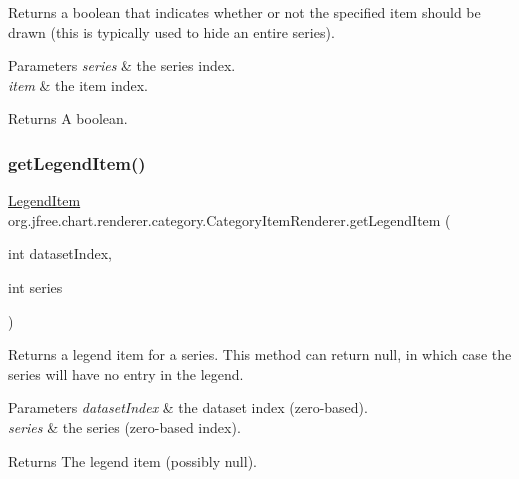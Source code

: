 Returns a boolean that indicates whether or not the specified item should be drawn (this is typically used to hide an entire series).


\begin{DoxyParams}{Parameters}
{\em series} & the series index. \\
\hline
{\em item} & the item index.\\
\hline
\end{DoxyParams}
\begin{DoxyReturn}{Returns}
A boolean. 
\end{DoxyReturn}
\mbox{\label{interfaceorg_1_1jfree_1_1chart_1_1renderer_1_1category_1_1_category_item_renderer_ab9269f34c8b4859211e4f4472636c93c}} 
\subsubsection{\texorpdfstring{get\+Legend\+Item()}{getLegendItem()}}
{\footnotesize\ttfamily \mbox{\hyperlink{classorg_1_1jfree_1_1chart_1_1_legend_item}{Legend\+Item}} org.\+jfree.\+chart.\+renderer.\+category.\+Category\+Item\+Renderer.\+get\+Legend\+Item (\begin{DoxyParamCaption}\item[{int}]{dataset\+Index,  }\item[{int}]{series }\end{DoxyParamCaption})}

Returns a legend item for a series. This method can return {\ttfamily null}, in which case the series will have no entry in the legend.


\begin{DoxyParams}{Parameters}
{\em dataset\+Index} & the dataset index (zero-\/based). \\
\hline
{\em series} & the series (zero-\/based index).\\
\hline
\end{DoxyParams}
\begin{DoxyReturn}{Returns}
The legend item (possibly {\ttfamily null}). 
\end{DoxyReturn}


